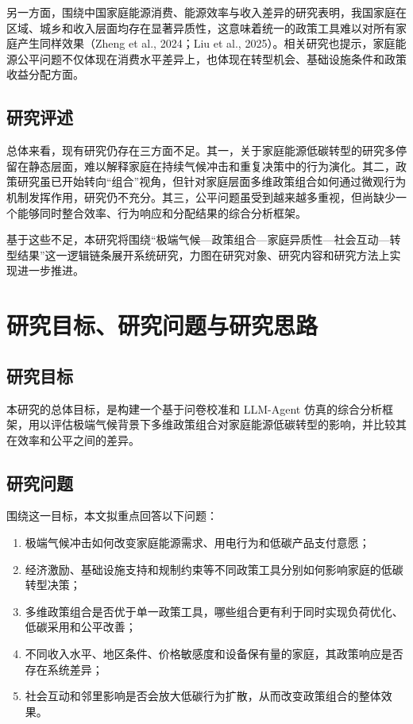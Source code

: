 \documentclass[12pt,a4paper]{ctexart}
\begin{document}
另一方面，围绕中国家庭能源消费、能源效率与收入差异的研究表明，我国家庭在区域、城乡和收入层面均存在显著异质性，这意味着统一的政策工具难以对所有家庭产生同样效果（Zheng et al., 2024；Liu et al., 2025）。相关研究也提示，家庭能源公平问题不仅体现在消费水平差异上，也体现在转型机会、基础设施条件和政策收益分配方面。

\subsection{研究评述}
总体来看，现有研究仍存在三方面不足。其一，关于家庭能源低碳转型的研究多停留在静态层面，难以解释家庭在持续气候冲击和重复决策中的行为演化。其二，政策研究虽已开始转向“组合”视角，但针对家庭层面多维政策组合如何通过微观行为机制发挥作用，研究仍不充分。其三，公平问题虽受到越来越多重视，但尚缺少一个能够同时整合效率、行为响应和分配结果的综合分析框架。

基于这些不足，本研究将围绕“极端气候—政策组合—家庭异质性—社会互动—转型结果”这一逻辑链条展开系统研究，力图在研究对象、研究内容和研究方法上实现进一步推进。

\section{研究目标、研究问题与研究思路}
\subsection{研究目标}
本研究的总体目标，是构建一个基于问卷校准和 LLM-Agent 仿真的综合分析框架，用以评估极端气候背景下多维政策组合对家庭能源低碳转型的影响，并比较其在效率和公平之间的差异。

\subsection{研究问题}
围绕这一目标，本文拟重点回答以下问题：
\begin{enumerate}[label=\arabic*.]
  \item 极端气候冲击如何改变家庭能源需求、用电行为和低碳产品支付意愿；
  \item 经济激励、基础设施支持和规制约束等不同政策工具分别如何影响家庭的低碳转型决策；
  \item 多维政策组合是否优于单一政策工具，哪些组合更有利于同时实现负荷优化、低碳采用和公平改善；
  \item 不同收入水平、地区条件、价格敏感度和设备保有量的家庭，其政策响应是否存在系统差异；
  \item 社会互动和邻里影响是否会放大低碳行为扩散，从而改变政策组合的整体效果。
\end{enumerate}
\end{document}
